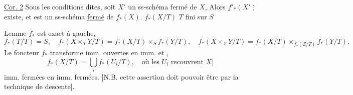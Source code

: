 \uline{Cor. 2} Sous les conditions dites, soit $X'$ un ss-schéma fermé de $X$,  Alors $f'_*(X')$ existe, et est un ss-schéma \uline{fermé} de $f_*(X)$.
$f_*(X/T)$ \qquad $T$ fini sur $S$

Lemme $f_*$ est exact à gauche,  
\[
f_*(T/T)=S,\quad f_*(X\times_T Y/T)=f_*(X/T)\times_S f_*(Y/T),\quad f_*(X\times_Z Y/T)=f_*(X/T)\times_{f_*(Z/T)}f_*(Y/T).
\]
Le foncteur $f_*$ transforme imm. ouvertes en imm.   et , \deleted{[\unsure{pourvu que}} 
\[
f_*(X/T)=\bigcup_i f_*(U_i/T),\quad\text{où les }U_i\text{ recouvrent }X]
\]
imm. fermées en imm. fermées.  
[N.B. cette assertion doit pouvoir être  par la technique de descente].

